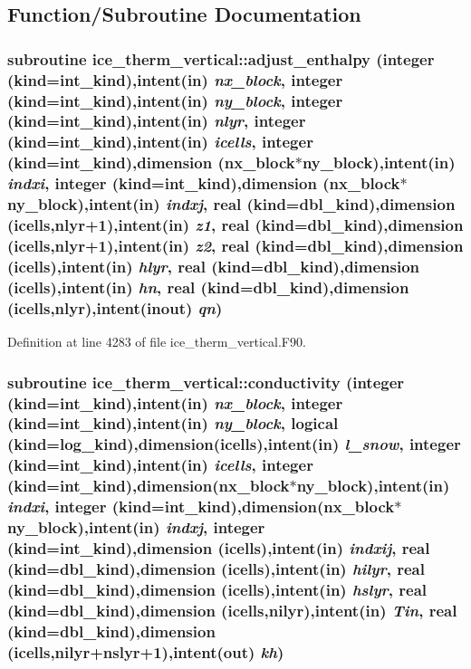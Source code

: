 \subsection{Function/Subroutine Documentation}
\hypertarget{namespaceice__therm__vertical_a6845923f0ff5d01b9c66f9a41d0eb24d}{
\subsubsection[{adjust\_\-enthalpy}]{\setlength{\rightskip}{0pt plus 5cm}subroutine ice\_\-therm\_\-vertical::adjust\_\-enthalpy (integer (kind=int\_\-kind),intent(in) {\em nx\_\-block}, \/  integer (kind=int\_\-kind),intent(in) {\em ny\_\-block}, \/  integer (kind=int\_\-kind),intent(in) {\em nlyr}, \/  integer (kind=int\_\-kind),intent(in) {\em icells}, \/  integer (kind=int\_\-kind),dimension (nx\_\-block$\ast$ny\_\-block),intent(in) {\em indxi}, \/  integer (kind=int\_\-kind),dimension (nx\_\-block$\ast$ny\_\-block),intent(in) {\em indxj}, \/  real (kind=dbl\_\-kind),dimension (icells,nlyr+1),intent(in) {\em z1}, \/  real (kind=dbl\_\-kind),dimension (icells,nlyr+1),intent(in) {\em z2}, \/  real (kind=dbl\_\-kind),dimension (icells),intent(in) {\em hlyr}, \/  real (kind=dbl\_\-kind),dimension (icells),intent(in) {\em hn}, \/  real (kind=dbl\_\-kind),dimension (icells,nlyr),intent(inout) {\em qn})}}
\label{namespaceice__therm__vertical_a6845923f0ff5d01b9c66f9a41d0eb24d}


Definition at line 4283 of file ice\_\-therm\_\-vertical.F90.\hypertarget{namespaceice__therm__vertical_aeeb37e6f39ffa2d7269ac471d047a789}{
\subsubsection[{conductivity}]{\setlength{\rightskip}{0pt plus 5cm}subroutine ice\_\-therm\_\-vertical::conductivity (integer (kind=int\_\-kind),intent(in) {\em nx\_\-block}, \/  integer (kind=int\_\-kind),intent(in) {\em ny\_\-block}, \/  logical (kind=log\_\-kind),dimension(icells),intent(in) {\em l\_\-snow}, \/  integer (kind=int\_\-kind),intent(in) {\em icells}, \/  integer (kind=int\_\-kind),dimension(nx\_\-block$\ast$ny\_\-block),intent(in) {\em indxi}, \/  integer (kind=int\_\-kind),dimension(nx\_\-block$\ast$ny\_\-block),intent(in) {\em indxj}, \/  integer (kind=int\_\-kind),dimension (icells),intent(in) {\em indxij}, \/  real (kind=dbl\_\-kind),dimension (icells),intent(in) {\em hilyr}, \/  real (kind=dbl\_\-kind),dimension (icells),intent(in) {\em hslyr}, \/  real (kind=dbl\_\-kind),dimension (icells,nilyr),intent(in) {\em Tin}, \/  real (kind=dbl\_\-kind),dimension (icells,nilyr+nslyr+1),intent(out) {\em kh})}}
\label{namespaceice__therm__vertical_aeeb37e6f39ffa2d7269ac471d047a789}


